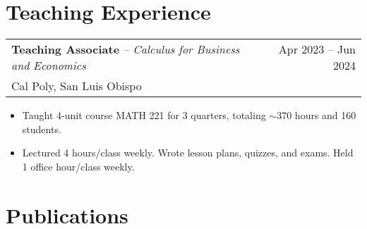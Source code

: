 \documentclass[a4paper,11pt]{article}
\makeatletter
\newenvironment{jobcustomlong}[4]
    {
    \begin{tabularx}{\linewidth}{@{}l X r@{}}
    \textbf{#1} \textit{#2} & \hfill &  #3 \\[-2.5pt]
    \textcolor{black!55!white}{\small #4} \\[2.5pt]
    \end{tabularx}
    \begin{minipage}[t]{\linewidth}
    \begin{itemize}[nosep,after=\strut, leftmargin=1.75em, itemsep=1pt,label={\small$\bullet$}]
    }
    {
    \end{itemize} \vspace{.325em}
    \end{minipage}   
    }
\newcommand{\calpoly}{\textcolor{black!55!white}{Cal Poly, San Luis Obispo}}
\makeatother
\begin{document}
\section{Teaching Experience}

\begin{jobcustomlong}{Teaching Associate}{-- Calculus for Business and Economics}{Apr 2023 -- Jun 2024}{\calpoly}
    \item Taught 4-unit course MATH 221 for 3 quarters, totaling $\sim$370 hours and 160 students.
    \item Lectured 4 hours/class weekly. Wrote lesson plans, quizzes, and exams. Held 1 office hour/class weekly.
\end{jobcustomlong}
\vspace{-1.5em}


\section{Publications}\label{sec:publications}
\begin{refsection}
\nocite{*}
\printbibliography[heading=none]
\end{refsection}
\end{document}
